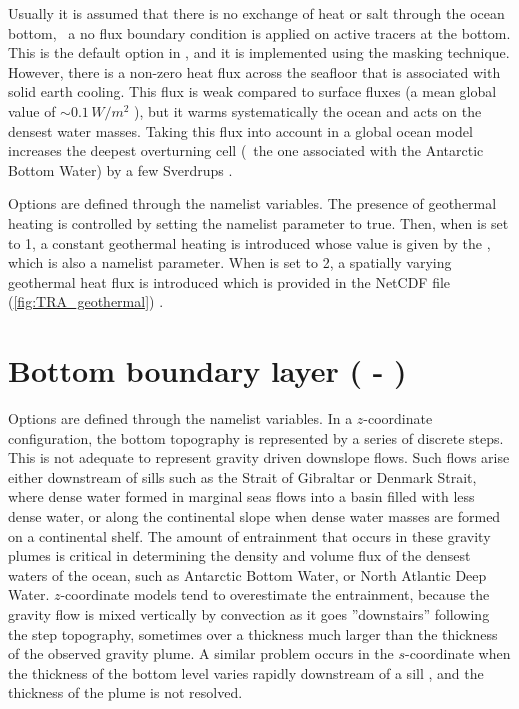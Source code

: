 \documentclass[../main/NEMO_manual]{subfiles}
\begin{document}
Usually it is assumed that there is no exchange of heat or salt through the ocean bottom,
\ie\ a no flux boundary condition is applied on active tracers at the bottom.
This is the default option in \NEMO, and it is implemented using the masking technique.
However, there is a non-zero heat flux across the seafloor that
is associated with solid earth cooling.
This flux is weak compared to surface fluxes
(a mean global value of $\sim 0.1 \, W/m^2$ \citep{stein.stein_N92}),
but it warms systematically the ocean and acts on the densest water masses.
Taking this flux into account in a global ocean model increases the deepest overturning cell
(\ie\ the one associated with the Antarctic Bottom Water) by
a few Sverdrups \citep{emile-geay.madec_OS09}.

Options are defined through the  namelist variables.
The presence of geothermal heating is controlled by
setting the namelist parameter  to true.
Then, when  is set to 1, a constant geothermal heating is introduced whose
value is given by the , which is also a namelist parameter.
When  is set to 2,
a spatially varying geothermal heat flux is introduced which is provided in
the  NetCDF file
(\autoref{fig:TRA_geothermal}) \citep{emile-geay.madec_OS09}.

\section[Bottom boundary layer (\textit{trabbl.F90} - \forcode{ln_trabbl})]{Bottom boundary layer (\protect{} - \protect{})}
\label{sec:TRA_bbl}

\begin{listing}
  \caption{}
  \label{lst:nambbl}
\end{listing}

Options are defined through the  namelist variables.
In a $z$-coordinate configuration, the bottom topography is represented by a series of discrete steps.
This is not adequate to represent gravity driven downslope flows.
Such flows arise either downstream of sills such as the Strait of Gibraltar or Denmark Strait,
where dense water formed in marginal seas flows into a basin filled with less dense water,
or along the continental slope when dense water masses are formed on a continental shelf.
The amount of entrainment that occurs in these gravity plumes is critical in
determining the density and volume flux of the densest waters of the ocean,
such as Antarctic Bottom Water, or North Atlantic Deep Water.
$z$-coordinate models tend to overestimate the entrainment,
because the gravity flow is mixed vertically by convection as
it goes ''downstairs'' following the step topography,
sometimes over a thickness much larger than the thickness of the observed gravity plume.
A similar problem occurs in the $s$-coordinate when
the thickness of the bottom level varies rapidly downstream of a sill
\citep{willebrand.barnier.ea_PO01}, and the thickness of the plume is not resolved.
\end{document}
